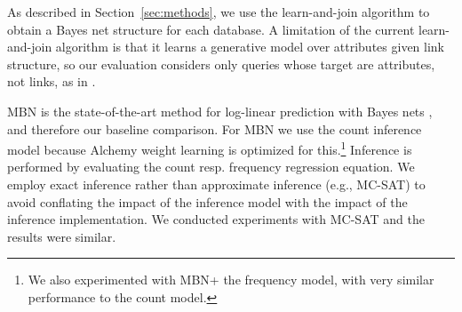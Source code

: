 \documentclass[twoside,leqno,twocolumn]{article}
\begin{document}



As described in Section~\ref{sec:methods}, we use the learn-and-join algorithm to obtain a Bayes net structure for each database. A limitation of the current learn-and-join algorithm is that it learns a generative model over attributes given link structure, so our evaluation considers only queries whose target are attributes, not links, as in \cite{Khosravi2010,Schulte2012}. 

 MBN is the state-of-the-art method for log-linear prediction with Bayes nets \cite{Schulte2010}, and therefore our baseline comparison. 
For MBN we use the count inference model because Alchemy weight learning is optimized for this.\footnote{We also experimented with MBN+ the frequency model, with very similar performance to the count model.} 
Inference is performed by evaluating the count resp. frequency regression equation. We employ exact inference rather than approximate inference (e.g., MC-SAT) to avoid conflating the impact of the inference model with the impact of the inference implementation. We conducted experiments with MC-SAT and the results were similar.
%
%
%
%
%
\end{document}
